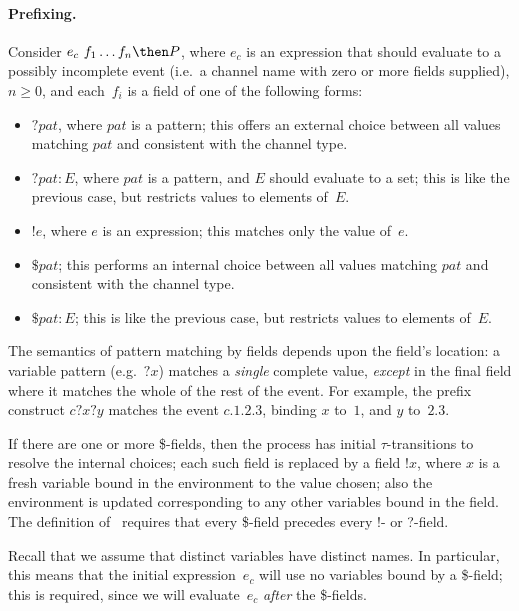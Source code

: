 \paragraph{Prefixing.}  Consider $e_c ~ f_1 \ldots f_n \then P$, where $e_c$
is an expression that should evaluate to a possibly incomplete event (i.e.~a
channel name with zero or more fields supplied), $n \ge 0$, and each~$f_i$ is
a field of one of the following forms:
  \begin{itemize}
  \item $? pat$, where $pat$ is a pattern; this offers an external choice
    between all values matching $pat$ and consistent with the channel type. 

  \item $?pat : E$, where $pat$ is a pattern, and $E$ should evaluate to a
    set; this is like the previous case, but restricts values to elements
    of~$E$. 

  \item $!e$, where $e$ is an expression; this matches only the value of~$e$. 

  \item $\$ pat$; this performs an internal choice between all values matching
    $pat$ and consistent with the channel type.
 
  \item $\$ pat : E$; this is like the previous case, but restricts values to
    elements of~$E$.
  \end{itemize}
  The semantics of pattern matching by fields depends upon the field's
  location: a variable pattern (e.g.~$?x$) matches a \emph{single} complete
  value, \emph{except} in the final field where it matches the whole of the
  rest of the event.  For example, the prefix construct $c?x?y$ matches the
  event $c.1.2.3$, binding $x$ to~$1$, and $y$ to~$2.3$.

  If there are one or more \$-fields, then the process has initial
  $\tau$-transitions to resolve the internal choices; each such field is
  replaced by a field $!x$, where $x$ is a fresh variable bound in the
  environment to the value chosen; also the environment is updated
  corresponding to any other variables bound in the field.  The definition of
  \CSPm\ requires that every \$-field precedes every !- or ?-field.

  Recall that we assume that distinct variables have distinct names.  In
  particular, this means that the initial expression~$e_c$ will use no
  variables bound by a \$-field; this is required, since we will
  evaluate~$e_c$ \emph{after} the \$-fields. 

